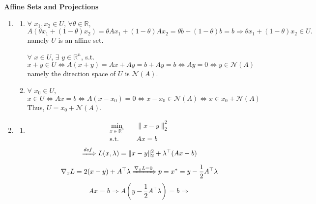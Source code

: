 \documentclass[11pt,letter,notitlepage]{article}
\theoremstyle{definition}
\begin{document}
\newpage

    \begin{solution}\textbf{Affine Sets and Projections}
        \begin{enumerate}[label=(\arabic*)]
        \item 
        \begin{enumerate}[label=(\alph*)]
            \item 
            $\forall$ $x_1, x_2 \in U$, $\forall \theta \in \mathbb{R}$, 
            \[
            A(\theta x_1 + (1-\theta)x_2) = \theta Ax_1 + (1-\theta)Ax_2 = \theta b + (1-\theta)b = b
            \Longrightarrow
            \theta x_1 + (1-\theta)x_2 \in U.
            \]
            namely $U$ is an affine set. 

            $\forall$ $x \in U$, $\exists$ $y \in \mathbb{R}^n$, s.t.
            \[
            x+y\in U
            \Longleftrightarrow
            A(x+y) = Ax+Ay = b+Ay = b
            \Longleftrightarrow
            Ay = 0
            \Longleftrightarrow
            y \in \mathcal{N}(A)
            \]
            namely the direction space of $U$ is $\mathcal{N}(A)$.
            \item 
            $\forall$ $x_0 \in U$,
            \[
            x\in U
            \Longleftrightarrow
            Ax = b
            \Longleftrightarrow
            A(x - x_0) = 0
            \Longleftrightarrow
            x - x_0 \in \mathcal{N}(A)
            \Longleftrightarrow
            x \in x_0 + \mathcal{N}(A)
            \]
            Thus, $U = x_0 + \mathcal{N}(A)$.
        \end{enumerate}
        \item 
        \begin{enumerate}[label=(\alph*)]
            \item 
            \begin{align*}
                \min_{x \in \mathbb{R}^n} \quad & \|x - y\|_2^2 \\
                \text{s.t.} \quad & A x = b
            \end{align*}
            \[
            \xRightarrow{def}
            L(x, \lambda) = \|x - y\|_2^2 + \lambda^{\top}(A x - b)
            \]
            \[
            \nabla_{x} L
            =
            2(x-y) + A^{\top} \lambda
            \xRightarrow{\nabla_{x} L = 0}
            p = x^* = y - \frac{1}{2} A^{\top} \lambda
            \]
            \[
            Ax = b
            \Longrightarrow
            A(y - \frac{1}{2} A^{\top} \lambda) = b
            \Longrightarrow
\]
\end{enumerate}
\end{enumerate}
\end{solution}
\end{document}

